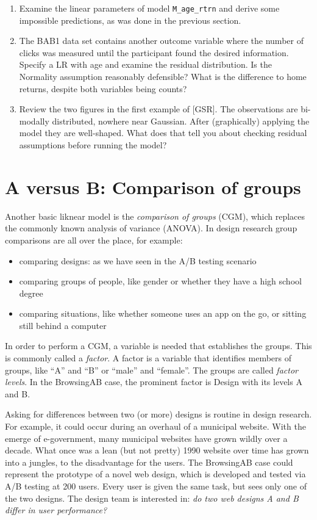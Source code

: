 \documentclass[]{svmono}
\providecommand{\tightlist}{%
  \setlength{\itemsep}{0pt}\setlength{\parskip}{0pt}}
\theoremstyle{definition}
\theoremstyle{definition}
\theoremstyle{definition}
\theoremstyle{remark}
\begin{document}
\begin{enumerate}
\def\labelenumi{\arabic{enumi}.}
\item
  Examine the linear parameters of model \texttt{M\_age\_rtrn} and
  derive some impossible predictions, as was done in the previous
  section.
\item
  The BAB1 data set contains another outcome variable where the number
  of clicks was measured until the participant found the desired
  information. Specify a LR with age and examine the residual
  distribution. Is the Normality assumption reasonably defensible? What
  is the difference to home returns, despite both variables being
  counts?
\item
  Review the two figures in the first example of {[}GSR{]}. The
  observations are bi-modally distributed, nowhere near Gaussian. After
  (graphically) applying the model they are well-shaped. What does that
  tell you about checking residual assumptions before running the model?
\end{enumerate}

\section{A versus B: Comparison of groups}\label{CGM}

Another basic liknear model is the \emph{comparison of groups} (CGM),
which replaces the commonly known analysis of variance (ANOVA). In
design research group comparisons are all over the place, for example:

\begin{itemize}
\tightlist
\item
  comparing designs: as we have seen in the A/B testing scenario
\item
  comparing groups of people, like gender or whether they have a high
  school degree
\item
  comparing situations, like whether someone uses an app on the go, or
  sitting still behind a computer
\end{itemize}

In order to perform a CGM, a variable is needed that establishes the
groups. This is commonly called a \emph{factor}. A factor is a variable
that identifies members of groups, like ``A'' and ``B'' or ``male'' and
``female''. The groups are called \emph{factor levels}. In the
BrowsingAB case, the prominent factor is Design with its levels A and B.

Asking for differences between two (or more) designs is routine in
design research. For example, it could occur during an overhaul of a
municipal website. With the emerge of e-government, many municipal
websites have grown wildly over a decade. What once was a lean (but not
pretty) 1990 website over time has grown into a jungles, to the
disadvantage for the users. The BrowsingAB case could represent the
prototype of a novel web design, which is developed and tested via A/B
testing at 200 users. Every user is given the same task, but sees only
one of the two designs. The design team is interested in: \emph{do two
web designs A and B differ in user performance?}
\end{document}
